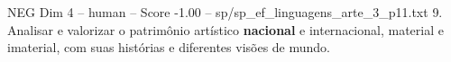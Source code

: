 \begin{textsample}{NEG Dim 4 – human – Score -1.00 – sp/sp\_ef\_linguagens\_arte\_3\_p11.txt}  \label{ex:f4_neg_020}
9.
Analisar e valorizar o patrimônio artístico \textbf{nacional} e internacional, material e imaterial, com suas histórias e diferentes visões de mundo.

\end{textsample}
